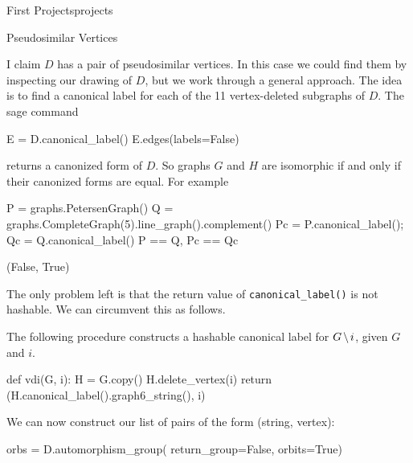 \begin{chap}{First Projects}{projects}
\begin{sect}{Pseudosimilar Vertices}
\begin{para}
I claim $D$ has a pair of pseudosimilar vertices. In this case we could find them
by inspecting our drawing of $D$, but we work through a general approach.
The idea is to find a canonical label for each of the 11 vertex-deleted subgraphs
of $D$. The sage command
\end{para}
%
\begin{sagecode}
\begin{sageinput}
E = D.canonical_label()
E.edges(labels=False)
\end{sageinput}
\begin{sageoutput}
[(0, 10), (1, 10), (2, 8), (3, 9), (4, 6), 
(4, 10), (5, 7), (5, 8), (6, 9), (7, 9)]
\end{sageoutput}
\end{sagecode}
%
\begin{para}
returns a canonized form of $D$. So graphs $G$ and $H$ are isomorphic if and only if
their canonized forms are equal. For example
\end{para}
%
\begin{sagecode}
\begin{sageinput}
P = graphs.PetersenGraph()
Q = graphs.CompleteGraph(5).line_graph().complement()
Pc = P.canonical_label(); Qc = Q.canonical_label()
P == Q, Pc == Qc
\end{sageinput}
\begin{sageoutput}
(False, True)
\end{sageoutput}
\end{sagecode}
%
\begin{para}
The only problem left is that the return value of \verb|canonical_label()|
is not hashable. We can circumvent this as follows.
\end{para}
%
\begin{para}
The following procedure constructs a hashable canonical label for 
$G\mathbin{\mkern-1.5mu\setminus\mkern-1.5mu} i$, given $G$ and $i$.
\end{para}
%
\begin{sagecode}
\begin{sageinput}
def vdi(G, i):
    H = G.copy()
    H.delete_vertex(i)
    return (H.canonical_label().graph6_string(), i)
\end{sageinput}
\end{sagecode}
%
\begin{para}
We can now construct our list of pairs of the form (string, vertex):
\end{para}
%
\begin{sagecode}
\begin{sageinput}
orbs = D.automorphism_group( return_group=False, orbits=True)

\end{sageinput}
\end{sagecode}
\end{sect}
\end{chap}
